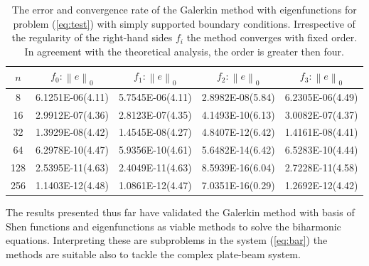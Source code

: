 \documentclass{marine_2015}
\newcommand{\norm}[1]{\ensuremath{\left\|#1\right\|}}
\begin{document}
\begin{table}[t!]
    \begin{center}
    \begin{tabular}{ccccc}
\hline
$n$  &  $f_0: \norm{e}_0$  & $f_1: \norm{e}_0$ & $f_2: \norm{e}_0$ & $f_3: \norm{e}_0$\\
\hline
8    & 6.1251E-06(4.11) & 5.7545E-06(4.11) & 2.8982E-08(5.84)& 6.2305E-06(4.49) \\
16   & 2.9912E-07(4.36) & 2.8123E-07(4.35) & 4.1493E-10(6.13)& 3.0082E-07(4.37) \\
32   & 1.3929E-08(4.42) & 1.4545E-08(4.27) & 4.8407E-12(6.42)& 1.4161E-08(4.41) \\
64   & 6.2978E-10(4.47) & 5.9356E-10(4.61) & 5.6482E-14(6.42)& 6.5283E-10(4.44) \\
128  & 2.5395E-11(4.63) & 2.4049E-11(4.63) & 8.5939E-16(6.04)& 2.7228E-11(4.58) \\
256  & 1.1403E-12(4.48) & 1.0861E-12(4.47) & 7.0351E-16(0.29)& 1.2692E-12(4.42) \\
\hline
\hline
    \end{tabular}
    \caption{The error and convergence rate of the Galerkin method with eigenfunctions for
    problem (\ref{eq:test}) with simply supported boundary conditions.
  Irrespective of the regularity of the right-hand sides $f_i$ the method
converges with fixed order. In agreement with the theoretical analysis, the
order is greater then four.}
  \label{tab:sine_convergence}
  \end{center}
  \end{table}

  The results presented thus far have validated the Galerkin method with basis
  of Shen functions and eigenfunctions as viable methods to solve the biharmonic
  equations. Interpreting these are subproblems in the system (\ref{eq:bar}) the
  methods are suitable also to tackle the complex plate-beam system.
\end{document}
